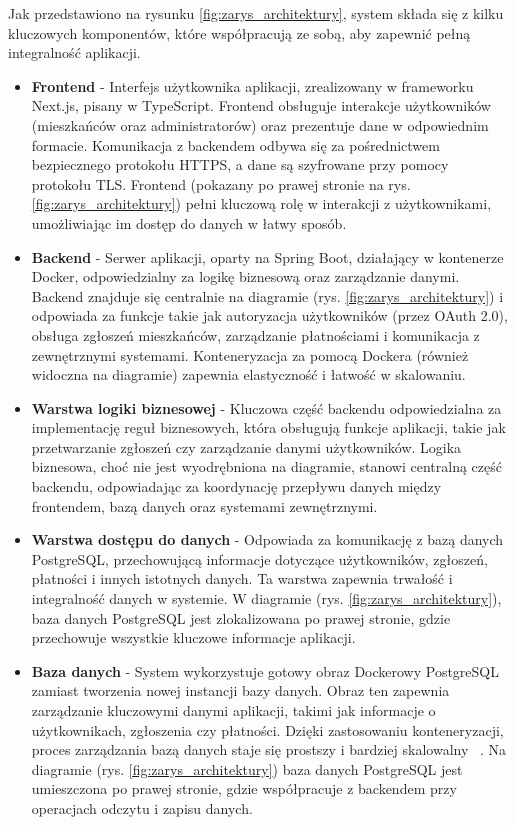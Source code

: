 Jak przedstawiono na rysunku \ref{fig:zarys_architektury}, system składa się z kilku kluczowych komponentów, które współpracują ze sobą, aby zapewnić pełną integralność aplikacji.

\begin{itemize} 

	\item \textbf{Frontend} - Interfejs użytkownika aplikacji, zrealizowany w frameworku Next.js, pisany w TypeScript. Frontend obsługuje interakcje użytkowników (mieszkańców oraz administratorów) oraz prezentuje dane w odpowiednim formacie. Komunikacja z backendem odbywa się za pośrednictwem bezpiecznego protokołu HTTPS, a dane są szyfrowane przy pomocy protokołu TLS. Frontend (pokazany po prawej stronie na rys. \ref{fig:zarys_architektury}) pełni kluczową rolę w interakcji z użytkownikami, umożliwiając im dostęp do danych w łatwy sposób.

	\item \textbf{Backend} - Serwer aplikacji, oparty na Spring Boot, działający w kontenerze Docker, odpowiedzialny za logikę biznesową oraz zarządzanie danymi. Backend znajduje się centralnie na diagramie (rys. \ref{fig:zarys_architektury}) i odpowiada za funkcje takie jak autoryzacja użytkowników (przez OAuth 2.0), obsługa zgłoszeń mieszkańców, zarządzanie płatnościami i komunikacja z zewnętrznymi systemami. Konteneryzacja za pomocą Dockera (również widoczna na diagramie) zapewnia elastyczność i łatwość w skalowaniu.

	\item \textbf{Warstwa logiki biznesowej} - Kluczowa część backendu odpowiedzialna za implementację reguł biznesowych, która obsługują funkcje aplikacji, takie jak przetwarzanie zgłoszeń czy zarządzanie danymi użytkowników. Logika biznesowa, choć nie jest wyodrębniona na diagramie, stanowi centralną część backendu, odpowiadając za koordynację przepływu danych między frontendem, bazą danych oraz systemami zewnętrznymi.

	\item \textbf{Warstwa dostępu do danych} - Odpowiada za komunikację z bazą danych PostgreSQL, przechowującą informacje dotyczące użytkowników, zgłoszeń, płatności i innych istotnych danych. Ta warstwa zapewnia trwałość i integralność danych w systemie. W diagramie (rys. \ref{fig:zarys_architektury}), baza danych PostgreSQL jest zlokalizowana po prawej stronie, gdzie przechowuje wszystkie kluczowe informacje aplikacji.

	\item \textbf{Baza danych} - System wykorzystuje gotowy obraz Dockerowy PostgreSQL zamiast tworzenia nowej instancji bazy danych. Obraz ten zapewnia zarządzanie kluczowymi danymi aplikacji, takimi jak informacje o użytkownikach, zgłoszenia czy płatności. Dzięki zastosowaniu konteneryzacji, proces zarządzania bazą danych staje się prostszy i bardziej skalowalny ~\cite{Docker-docs,vsupalov}. Na diagramie (rys. \ref{fig:zarys_architektury}) baza danych PostgreSQL jest umieszczona po prawej stronie, gdzie współpracuje z backendem przy operacjach odczytu i zapisu danych.


\end{itemize}
